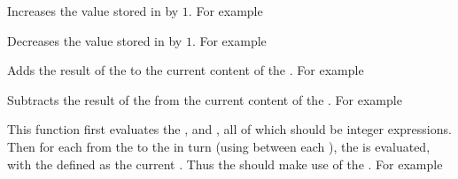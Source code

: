 \documentclass[oneside]{book}
\begin{document}
\begin{function}{\IntIncr}
\begin{syntax}
 
\end{syntax}
Increases the value stored in  by $1$.
For example
\begin{demohigh}
\IntSet{}
\IntIncr\lTmpaInt
\IntUse\lTmpaInt
\end{demohigh}
\end{function}

\begin{function}{\IntDecr}
\begin{syntax}
 
\end{syntax}
Decreases the value stored in  by $1$.
For example
\begin{demohigh}
\IntSet{}
\IntDecr\lTmpaInt
\IntUse\lTmpaInt
\end{demohigh}
\end{function}

\begin{function}{\IntAdd}
\begin{syntax}
  
\end{syntax}
Adds the result of the  to the current
content of the . For example
\begin{demohigh}
\IntSet{}
\IntAdd{}
\IntUse\lTmpaInt
\end{demohigh}
\end{function}

\begin{function}{\IntSub}
\begin{syntax}
  
\end{syntax}
Subtracts the result of the  from the
current content of the . For example
\begin{demohigh}
\IntSet{}
\IntSub{}
\IntUse\lTmpaInt
\end{demohigh}
\end{function}

\begin{function}{\IntStepVariable}
\begin{syntax}
     
\end{syntax}
This function first evaluates the , 
and , all of which should be integer expressions.
Then for each  from the  to the
 in turn (using  between each
), the  is evaluated,
with the  defined as the current .  Thus
the  should make use of the .
For example
\begin{demohigh}
\TlClear\lTmpaTl
{}\lTmpiTl{
  \TlPutRight\lTmpaTl{\Value\lTmpiTl}
  \TlPutRight\lTmpaTl{ }
}
\Result{\Value\lTmpaTl}
\end{demohigh}
\end{function}
\end{document}
